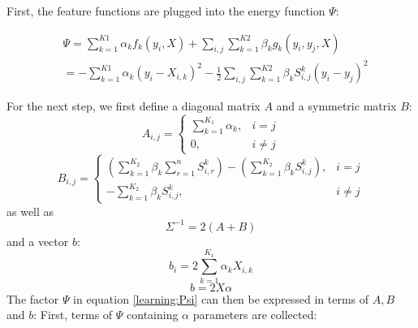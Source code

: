 First, the feature functions are plugged into the energy function $\Psi$:

\begin{equation}
\label{learning:Psi}
\begin{split}
& \Psi = \sum\limits_{k=1}^{K1} \alpha_k f_k(y_i, X) + \sum_{i,j} \sum \limits_{k=1}^{K2} \beta_k g_k (y_i, y_j,X) \\
& = -\sum\limits_{k=1}^{K1} \alpha_k (y_i - X_{i,k})^2 - \frac{1}{2} \sum_{i,j} \sum \limits_{k=1}^{K2} \beta_k S_{i,j}^k(y_i-y_j)^2
\end{split}
\end{equation}

For the next step, we first define a diagonal matrix $A$ and a symmetric matrix $B$:
\begin{equation}
A_{i,j}=
\begin{cases}
\sum_{k=1}^{K_1} \alpha_k, & i=j\\
0, & i \neq j
\end{cases}
\end{equation}
\begin{equation}
B_{i,j} = 
\begin{cases}
(\sum_{k=1}^{K_2}\beta_k \sum_{r=1}^{n} S_{i,r}^k) - (\sum_{k=1}^{K_2} \beta_k S_{i,j}^{k}), & i=j \\
-\sum_{k=1}^{K_2} \beta_k S_{i,j}^k, & i \neq j
\end{cases}
\end{equation}
as well as 
\begin{equation}
\Sigma^{-1} = 2(A+B)
\end{equation}
and a vector $b$:
\begin{equation}
b_i = 2 \sum \limits_{k=1}^{K_1} \alpha_k X_{i,k}
\end{equation}
\begin{equation}
b = 2X\alpha
\end{equation}
The factor $\Psi$ in equation \ref{learning:Psi} can then be expressed in terms of $A, B$ and $b$:
First, terms of $\Psi$ containing $\alpha$ parameters are collected:

